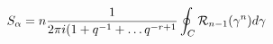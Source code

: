 \begin{equation}
S_\alpha
 = n\frac{1}{2\pi i(1+q^{-1}+\dots q^{-r+1}}\oint_C {\cal R}_{n-1}
(\gamma^n)d\gamma
\end{equation}

